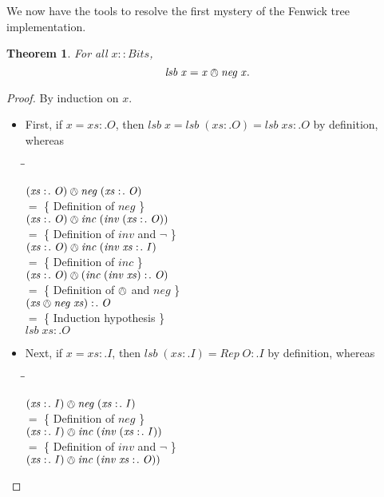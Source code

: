 \documentclass{jfp}
\newcommand{\Conid}[1]{\mathit{#1}}
\newcommand{\Varid}[1]{\mathit{#1}}
\newenvironment{sproof}{%
    \begin{tabbing}
    \phantom{$\equiv$} \= \qquad\qquad\qquad\qquad\qquad \= \kill
}{
    \end{tabbing}
}
\newcommand{\stmt}[1]{\> \ensuremath{#1} \\}
\newcommand{\reason}[2]{\ensuremath{#1} \>\> \{ \quad #2 \quad \} \\}
\newtheorem{thm}{Theorem}[section]
\theoremstyle{definition}
\theoremstyle{remark}
\begin{document}
We now have the tools to resolve the first mystery of the Fenwick tree
implementation.
\begin{thm}
  For all \ensuremath{\Varid{x}\mathbin{::}\Conid{Bits}}, \[ \ensuremath{\Varid{lsb}\;\Varid{x}\mathrel{=}\Varid{x}\owedge\Varid{neg}\;\Varid{x}}. \]
\end{thm}
\begin{proof}
By induction on \ensuremath{\Varid{x}}.
\begin{itemize}
\item First, if \ensuremath{\Varid{x}\mathrel{=}\Varid{xs}\mathrel{:\!.}\Conid{O}}, then \ensuremath{\Varid{lsb}\;\Varid{x}\mathrel{=}\Varid{lsb}\;(\Varid{xs}\mathrel{:\!.}\Conid{O})\mathrel{=}\Varid{lsb}\;\Varid{xs}\mathrel{:\!.}\Conid{O}}
  by definition, whereas
  \begin{sproof}
    \stmt{\ensuremath{(\Varid{xs}\mathrel{:\!.}\Conid{O})\owedge\Varid{neg}\;(\Varid{xs}\mathrel{:\!.}\Conid{O})}}
    \reason{=}{Definition of \ensuremath{\Varid{neg}}}
    \stmt{\ensuremath{(\Varid{xs}\mathrel{:\!.}\Conid{O})\owedge\Varid{inc}\;(\Varid{inv}\;(\Varid{xs}\mathrel{:\!.}\Conid{O}))}}
    \reason{=}{Definition of \ensuremath{\Varid{inv}} and \ensuremath{\neg}}
    \stmt{\ensuremath{(\Varid{xs}\mathrel{:\!.}\Conid{O})\owedge\Varid{inc}\;(\Varid{inv}\;\Varid{xs}\mathrel{:\!.}\Conid{I})}}
    \reason{=}{Definition of \ensuremath{\Varid{inc}}}
    \stmt{\ensuremath{(\Varid{xs}\mathrel{:\!.}\Conid{O})\owedge(\Varid{inc}\;(\Varid{inv}\;\Varid{xs})\mathrel{:\!.}\Conid{O})}}
    \reason{=}{Definition of \ensuremath{\owedge} and \ensuremath{\Varid{neg}}}
    \stmt{\ensuremath{(\Varid{xs}\owedge\Varid{neg}\;\Varid{xs})\mathrel{:\!.}\Conid{O}}}
    \reason{=}{Induction hypothesis}
    \stmt{\ensuremath{\Varid{lsb}\;\Varid{xs}\mathrel{:\!.}\Conid{O}}}
  \end{sproof}
\item Next, if \ensuremath{\Varid{x}\mathrel{=}\Varid{xs}\mathrel{:\!.}\Conid{I}}, then \ensuremath{\Varid{lsb}\;(\Varid{xs}\mathrel{:\!.}\Conid{I})\mathrel{=}\Conid{Rep}\;\Conid{O}\mathrel{:\!.}\Conid{I}} by
  definition, whereas
  \begin{sproof}
    \stmt{\ensuremath{(\Varid{xs}\mathrel{:\!.}\Conid{I})\owedge\Varid{neg}\;(\Varid{xs}\mathrel{:\!.}\Conid{I})}}
    \reason{=}{Definition of \ensuremath{\Varid{neg}}}
    \stmt{\ensuremath{(\Varid{xs}\mathrel{:\!.}\Conid{I})\owedge\Varid{inc}\;(\Varid{inv}\;(\Varid{xs}\mathrel{:\!.}\Conid{I}))}}
    \reason{=}{Definition of \ensuremath{\Varid{inv}} and \ensuremath{\neg}}
    \stmt{\ensuremath{(\Varid{xs}\mathrel{:\!.}\Conid{I})\owedge\Varid{inc}\;(\Varid{inv}\;\Varid{xs}\mathrel{:\!.}\Conid{O}))}}

\end{sproof}
\end{itemize}
\end{proof}
\end{document}
